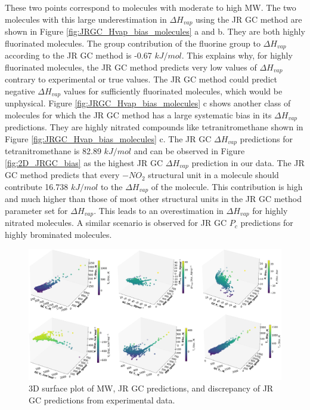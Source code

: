 \documentclass[journal=jacsat,manuscript=article]{achemso}
\begin{document}
These two points correspond to molecules with moderate to high MW. The two molecules with this large underestimation in  $\Delta H_{vap}$ using the JR GC method are shown in Figure \ref{fig:JRGC_Hvap_bias_molecules} a and b. They are both highly fluorinated molecules. The group contribution of the fluorine group to $\Delta H_{vap}$ according to the JR GC method is -0.67 $kJ/mol$. This explains why, for highly fluorinated molecules, the JR GC method predicts very low values of $\Delta H_{vap}$ contrary to experimental or true values. The JR GC method could predict negative $\Delta H_{vap}$ values for sufficiently fluorinated molecules, which would be unphysical. Figure \ref{fig:JRGC_Hvap_bias_molecules} c shows another class of molecules for which the JR GC method has a large systematic bias in its $\Delta H_{vap}$ predictions. They are highly nitrated compounds like tetranitromethane shown in Figure \ref{fig:JRGC_Hvap_bias_molecules} c. The JR GC $\Delta H_{vap}$ predictions for tetranitromethane is 82.89 $kJ/mol$ and can be observed in Figure \ref{fig:2D_JRGC_bias} as the highest JR GC $\Delta H_{vap}$ prediction in our data. The JR GC method predicts that every $-NO_2$ structural unit in a molecule should contribute 16.738 $kJ/mol$ to the $\Delta H_{vap}$ of the molecule. This contribution is high and much higher than those of most other structural units in the JR GC method parameter set for $\Delta H_{vap}$. This leads to an overestimation in $\Delta H_{vap}$ for highly nitrated molecules.
A similar scenario is observed for JR GC $P_c$ predictions for highly brominated molecules.  


\begin{figure}[H]
    \centering
    \includegraphics[width=1.1\linewidth]{images/3D_gc_mw_exp.png}
    \caption{3D surface plot of MW, JR GC predictions, and discrepancy of JR GC predictions from experimental data.}
    \label{fig:3D_JRGC_MW_disc}
\end{figure}
\end{document}
